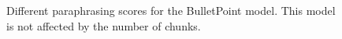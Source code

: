 \begin{figure}[htbp]
    \centering
    
    \caption{Different paraphrasing scores for the BulletPoint model. 
    This model is not affected by the number of chunks.}
    \label{fig:abl_chunks_Translation}
\end{figure}